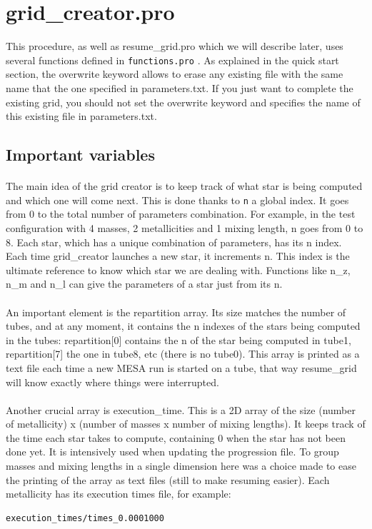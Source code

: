 \documentclass{report}
\begin{document}
\section{grid\_creator.pro}

This procedure, as well as resume\_grid.pro which we will describe later, uses several functions defined in \verb+functions.pro+ . As explained in the quick start section, the overwrite keyword allows to erase any existing file with the same name that the one specified in parameters.txt. If you just want to complete the existing grid, you should not set the overwrite keyword and specifies the name of this existing file in parameters.txt.

\subsection{Important variables}

\paragraph{}The main idea of the grid creator is to keep track of what star is being computed and which one will come next. This is done thanks to \verb+n+ a global 
index. It goes from 0 to the total number of parameters combination. For example, in the test configuration with 4 masses, 2 metallicities and 1 mixing
length, n goes from 0 to 8. Each star, which has a unique combination of parameters, has its n index. Each time grid\_creator launches a new star, it 
increments n. This index is the ultimate reference to know which star we are dealing with. Functions like n\_z, n\_m and n\_l can give the parameters
of a star just from its n.

\paragraph{}An important element is the repartition array. Its size matches the number of tubes, and at any moment, it contains the n indexes of 
the stars being computed in the tubes: repartition[0] contains the n of the star being computed in tube1, repartition[7] the one in tube8, etc (there 
is no tube0). This array is printed as a text file each time a new MESA run is started on a tube, that way resume\_grid will know exactly where things
were interrupted.

\paragraph{}Another crucial array is execution\_time. This is a 2D array of the size (number of metallicity) x (number of masses x number of mixing lengths). It keeps track of the time each star takes to compute, containing 0 when the star has not been done yet. It is intensively used when updating the progression file. To group masses and mixing lengths in a single dimension here was a choice made to ease the printing of the array as text files (still to make resuming easier). Each metallicity has its execution times file, for example:
\begin{verbatim}
execution_times/times_0.0001000
\end{verbatim}
\end{document}
